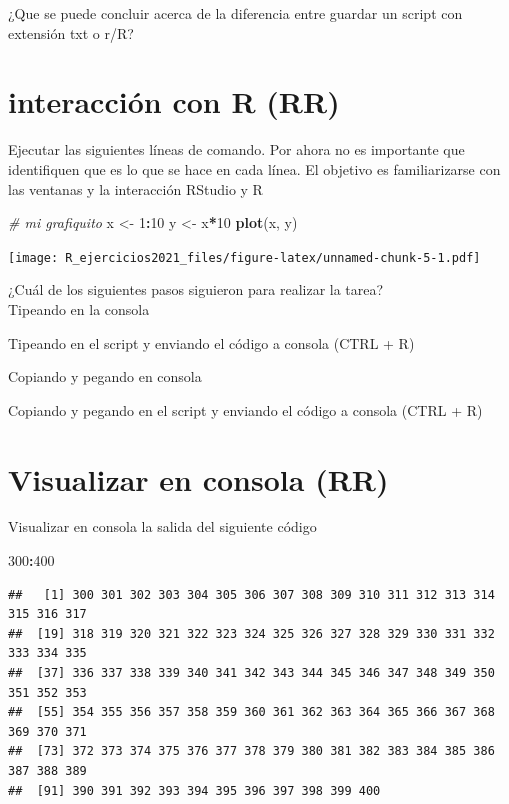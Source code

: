 \documentclass[]{book}
\newenvironment{Shaded}{\begin{snugshade}}{\end{snugshade}}
\newcommand{\CommentTok}[1]{\textcolor[rgb]{0.56,0.35,0.01}{\textit{#1}}}
\newcommand{\DecValTok}[1]{\textcolor[rgb]{0.00,0.00,0.81}{#1}}
\newcommand{\KeywordTok}[1]{\textcolor[rgb]{0.13,0.29,0.53}{\textbf{#1}}}
\newcommand{\NormalTok}[1]{#1}
\newcommand{\OperatorTok}[1]{\textcolor[rgb]{0.81,0.36,0.00}{\textbf{#1}}}
\newcommand{\StringTok}[1]{\textcolor[rgb]{0.31,0.60,0.02}{#1}}
\begin{document}
¿Que se puede concluir acerca de la diferencia entre guardar un script con extensión txt o r/R?

\hypertarget{interacciuxf3n-con-r-rr}{%
\section{interacción con R (RR)}\label{interacciuxf3n-con-r-rr}}

Ejecutar las siguientes líneas de comando. Por ahora no es importante que identifiquen que es lo que se hace en cada línea. El objetivo es familiarizarse con las ventanas y la interacción RStudio y R

\begin{Shaded}
\begin{Highlighting}[]
\CommentTok{# mi grafiquito}
\NormalTok{x <-}\StringTok{ }\DecValTok{1}\OperatorTok{:}\DecValTok{10}
\NormalTok{y <-}\StringTok{ }\NormalTok{x}\OperatorTok{*}\DecValTok{10}
\KeywordTok{plot}\NormalTok{(x, y)}
\end{Highlighting}
\end{Shaded}

\texttt{[image: R\_ejercicios2021\_files/figure-latex/unnamed-chunk-5-1.pdf]}

¿Cuál de los siguientes pasos siguieron para realizar la tarea?\\

Tipeando en la consola

Tipeando en el script y enviando el código a consola (CTRL + R)

Copiando y pegando en consola

Copiando y pegando en el script y enviando el código a consola (CTRL + R)

\hypertarget{visualizar-en-consola-rr}{%
\section{Visualizar en consola (RR)}\label{visualizar-en-consola-rr}}

Visualizar en consola la salida del siguiente código

\begin{Shaded}
\begin{Highlighting}[]
\DecValTok{300}\OperatorTok{:}\DecValTok{400}
\end{Highlighting}
\end{Shaded}

\begin{verbatim}
##   [1] 300 301 302 303 304 305 306 307 308 309 310 311 312 313 314 315 316 317
##  [19] 318 319 320 321 322 323 324 325 326 327 328 329 330 331 332 333 334 335
##  [37] 336 337 338 339 340 341 342 343 344 345 346 347 348 349 350 351 352 353
##  [55] 354 355 356 357 358 359 360 361 362 363 364 365 366 367 368 369 370 371
##  [73] 372 373 374 375 376 377 378 379 380 381 382 383 384 385 386 387 388 389
##  [91] 390 391 392 393 394 395 396 397 398 399 400
\end{verbatim}
\end{document}
